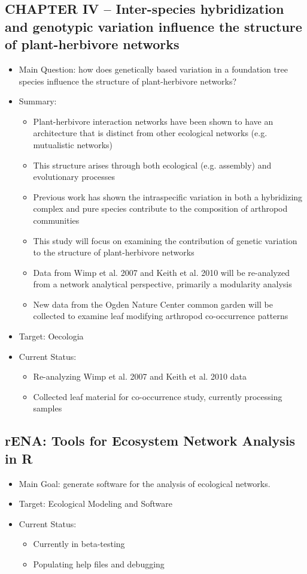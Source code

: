 \documentclass[12pt]{article}
\begin{document}
\subsection{CHAPTER IV -- Inter-species hybridization and genotypic variation
  influence the structure of plant-herbivore networks}
\begin{itemize}
\item Main Question: how does genetically based variation in a
  foundation tree species influence the structure of plant-herbivore networks?
\item Summary:
  \begin{itemize}
  \item Plant-herbivore interaction networks have been shown to have
    an architecture that is distinct from other ecological networks
    (e.g. mutualistic networks) \cite{thebault2010}
  \item This structure arises through both ecological (e.g. assembly)
    and evolutionary processes
  \item Previous work has shown the intraspecific variation in both a
    hybridizing complex and pure species contribute to the composition
    of arthropod communities \cite{wimp2007,keith2010}
  \item This study will focus on examining the contribution of
    genetic variation to the structure of plant-herbivore networks
  \item Data from Wimp et al. 2007 and Keith et al. 2010 will be
    re-analyzed from a network analytical perspective, primarily a
    modularity analysis \cite{fortuna2010}
  \item New data from the Ogden Nature Center common garden will be
    collected to examine leaf modifying arthropod co-occurrence
    patterns
  \end{itemize}
\item Target: Oecologia 
\item Current Status:
  \begin{itemize}
  \item Re-analyzing Wimp et al. 2007 and Keith et al. 2010 data
  \item Collected leaf material for co-occurrence study, currently
    processing samples
  \end{itemize}
\end{itemize}

\subsection{rENA: Tools for Ecosystem Network Analysis in R}
\begin{itemize}
\item Main Goal: generate software for the analysis of ecological
  networks.
\item Target: Ecological Modeling and Software  
\item Current Status:
  \begin{itemize}
  \item Currently in beta-testing
  \item Populating help files and debugging
  \end{itemize}
\end{itemize}
\end{document}
